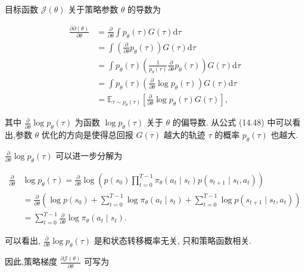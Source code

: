 \documentclass[10pt]{article}
\begin{document}
目标函数 $\mathcal{J}(\theta)$ 关于策略参数 $\theta$ 的导数为


\begin{align*}
\frac{\partial \mathcal{\partial}(\theta)}{\partial \theta} & =\frac{\partial}{\partial \theta} \int p_{\theta}(\tau) G(\tau) \mathrm{d} \tau  \tag{14.44}\\
& =\int\left(\frac{\partial}{\partial \theta} p_{\theta}(\tau)\right) G(\tau) \mathrm{d} \tau  \tag{14.45}\\
& =\int p_{\theta}(\tau)\left(\frac{1}{p_{\theta}(\tau)} \frac{\partial}{\partial \theta} p_{\theta}(\tau)\right) G(\tau) \mathrm{d} \tau  \tag{14.46}\\
& =\int p_{\theta}(\tau)\left(\frac{\partial}{\partial \theta} \log p_{\theta}(\tau)\right) G(\tau) \mathrm{d} \tau  \tag{14.47}\\
& =\mathbb{E}_{\tau \sim p_{\theta}(\tau)}\left[\frac{\partial}{\partial \theta} \log p_{\theta}(\tau) G(\tau)\right], \tag{14.48}
\end{align*}


其中 $\frac{\partial}{\partial \theta} \log p_{\theta}(\tau)$ 为函数 $\log p_{\theta}(\tau)$ 关于 $\theta$ 的偏导数. 从公式 (14.48) 中可以看出,参数 $\theta$ 优化的方向是使得总回报 $G(\tau)$ 越大的轨迹 $\tau$ 的概率 $p_{\theta}(\tau)$ 也越大.

$\frac{\partial}{\partial \theta} \log p_{\theta}(\tau)$ 可以进一步分解为


\begin{align*}
\frac{\partial}{\partial \theta} & \log p_{\theta}(\tau)=\frac{\partial}{\partial \theta} \log \left(p\left(s_{0}\right) \prod_{t=0}^{T-1} \pi_{\theta}\left(a_{t} \mid s_{t}\right) p\left(s_{t+1} \mid s_{t}, a_{t}\right)\right)  \tag{14.49}\\
& =\frac{\partial}{\partial \theta}\left(\log p\left(s_{0}\right)+\sum_{t=0}^{T-1} \log \pi_{\theta}\left(a_{t} \mid s_{t}\right)+\sum_{t=0}^{T-1} \log p\left(s_{t+1} \mid s_{t}, a_{t}\right)\right)  \tag{14.50}\\
& =\sum_{t=0}^{T-1} \frac{\partial}{\partial \theta} \log \pi_{\theta}\left(a_{t} \mid s_{t}\right) . \tag{14.51}
\end{align*}


可以看出, $\frac{\partial}{\partial \theta} \log p_{\theta}(\tau)$ 是和状态转移概率无关, 只和策略函数相关.

因此,策略梯度 $\frac{\partial \mathcal{J}(\theta)}{\partial \theta}$ 可写为
\end{document}
